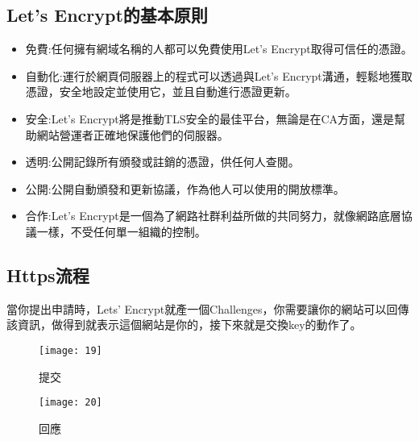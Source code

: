 \renewcommand{\baselinestretch}{20} %
\subsection{Let’s Encrypt的基本原則}
\par
\renewcommand{\baselinestretch}{1} %
\begin{itemize}
	\item 免費:任何擁有網域名稱的人都可以免費使用Let’s Encrypt取得可信任的憑證。
	\item 自動化:運行於網頁伺服器上的程式可以透過與Let’s Encrypt溝通，輕鬆地獲取憑證，安全地設定並使用它，並且自動進行憑證更新。
	\item 安全:Let’s Encrypt將是推動TLS安全的最佳平台，無論是在CA方面，還是幫助網站營運者正確地保護他們的伺服器。
	\item 透明:公開記錄所有頒發或註銷的憑證，供任何人查閱。
	\item 公開:公開自動頒發和更新協議，作為他人可以使用的開放標準。
	\item 合作:Let’s Encrypt是一個為了網路社群利益所做的共同努力，就像網路底層協議一樣，不受任何單一組織的控制。
\end{itemize}
\par

\renewcommand{\baselinestretch}{20} %
\subsection{Https流程}
\par
\renewcommand{\baselinestretch}{1} %
\twelve \qquad 當你提出申請時，Lets' Encrypt就產一個Challenges，你需要讓你的網站可以回傳該資訊，做得到就表示這個網站是你的，接下來就是交換key的動作了。
\\
\par
\begin{figure}[hbt!]
\begin{center}
\texttt{[image: 19]}
\caption{\large 提交}\label{fig.提交}
\end{center}
\end{figure}
\begin{figure}[hbt!]
\begin{center}
\texttt{[image: 20]}
\caption{\large 回應}\label{fig.回應}
\end{center}
\end{figure}
\par